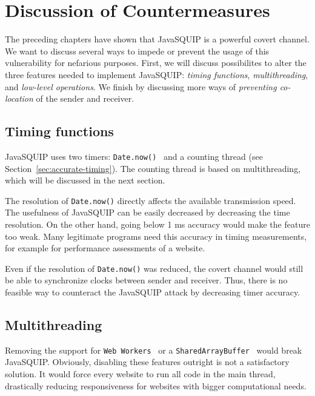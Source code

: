 \documentclass[11pt,
  titlepage=false,
  parskip=half,      %
]{scrreprt}
\begin{document}
\chapter{Discussion of Countermeasures}
\label{ch:countermeasures}

The preceding chapters have shown that JavaSQUIP is a powerful covert channel.
We want to discuss several ways to impede or prevent the usage of this vulnerability for nefarious purposes.
First, we will discuss possibilites to alter the three features needed to implement JavaSQUIP:
\textit{timing functions}, \textit{multithreading}, and \textit{low-level operations}.
We finish by discussing more ways of \textit{preventing co-location} of the sender and receiver.

\section{Timing functions}
JavaSQUIP uses two timers: \texttt{Date.now()}~\cite{datenow} and a counting thread (see Section~\ref{sec:accurate-timing}).
The counting thread is based on multithreading, which will be discussed in the next section.

The resolution of \texttt{Date.now()} directly affects the available transmission speed.
The usefulness of JavaSQUIP can be easily decreased by decreasing the time resolution.
On the other hand, going below 1 ms accuracy would make the feature too weak.
Many legitimate programs need this accuracy in timing measurements,
for example for performance assessments of a website.

Even if the resolution of \texttt{Date.now()} was reduced,
the covert channel would still be able to synchronize clocks between sender and receiver.
Thus, there is no feasible way to counteract the JavaSQUIP attack by decreasing timer accuracy.

\section{Multithreading}
Removing the support for \texttt{Web Workers}~\cite{webworkers} or a \texttt{SharedArrayBuffer}~\cite{sharedarraybuffer}
would break JavaSQUIP.
Obviously, disabling these features outright is not a satisfactory solution.
It would force every website to run all code in the main thread,
drastically reducing responsiveness for websites with bigger computational needs.
\end{document}
